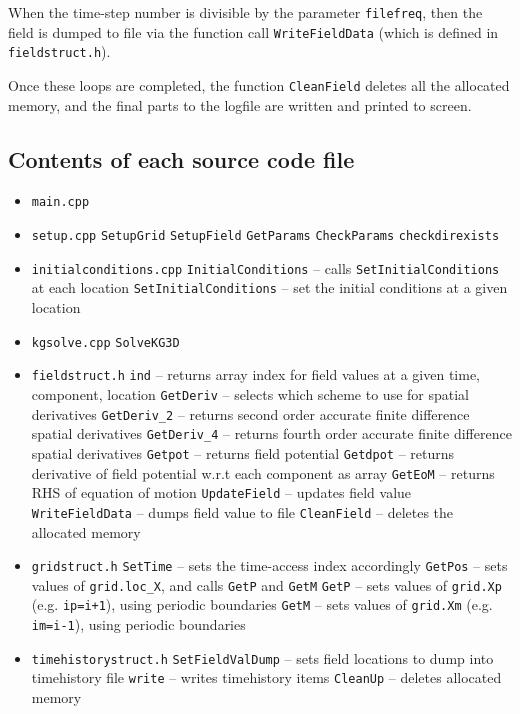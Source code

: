 \documentclass[amsmath,amssymb,12pt, eqsecnum]{revtex4}
\newcommand\codeRed[1]{\textcolor[rgb]{1,0,0}{{\tt #1}}}
\newcommand\codeBlue[1]{\textcolor[rgb]{0,0,1}{{\tt #1}}}
\begin{document}
When the time-step number is divisible by the parameter {\tt filefreq}, then the field is dumped to file via the function call \codeBlue{WriteFieldData} (which is defined in \codeRed{fieldstruct.h}).

Once these loops are completed, the function \codeBlue{CleanField} deletes all the allocated memory, and the final parts to the logfile are written and printed to screen.


\subsection{Contents of each source code file}
\begin{itemize}
\item \codeRed{main.cpp}
\item \codeRed{setup.cpp} 
\subitem \codeBlue{SetupGrid}
\subitem \codeBlue{SetupField}
\subitem \codeBlue{GetParams}
\subitem \codeBlue{CheckParams}
\subitem \codeBlue{checkdirexists}
\item \codeRed{initialconditions.cpp} 
\subitem \codeBlue{InitialConditions}  -- calls \codeBlue{SetInitialConditions} at each location
\subitem \codeBlue{SetInitialConditions} -- set the initial conditions at a given location
\item \codeRed{kgsolve.cpp} 
\subitem \codeBlue{SolveKG3D}
\item \codeRed{fieldstruct.h} 
\subitem \codeBlue{ind} -- returns array index for field values at a given time, component, location
\subitem \codeBlue{GetDeriv} -- selects which scheme to use for spatial derivatives
\subitem \codeBlue{GetDeriv\_2} -- returns second order accurate finite difference spatial derivatives
\subitem  \codeBlue{GetDeriv\_4} -- returns fourth order accurate finite difference spatial derivatives
\subitem \codeBlue{Getpot} -- returns field potential
\subitem \codeBlue{Getdpot} -- returns derivative of field potential w.r.t each component as array
\subitem \codeBlue{GetEoM} -- returns RHS of equation of motion
\subitem \codeBlue{UpdateField} -- updates field value
\subitem\codeBlue{WriteFieldData} -- dumps field value to file
\subitem \codeBlue{CleanField} -- deletes the allocated memory
\item \codeRed{gridstruct.h}
\subitem \codeBlue{SetTime} -- sets the time-access index accordingly
\subitem \codeBlue{GetPos} -- sets values of {\tt grid.loc\_X}, and calls \codeBlue{GetP} and  \codeBlue{GetM}
\subitem \codeBlue{GetP} -- sets values of {\tt grid.Xp} (e.g. {\tt ip=i+1}), using periodic boundaries 
\subitem \codeBlue{GetM} -- sets values of {\tt grid.Xm} (e.g. {\tt im=i-1}), using periodic boundaries 
\item \codeRed{timehistorystruct.h}
\subitem \codeBlue{SetFieldValDump} -- sets field locations to dump into timehistory file
\subitem \codeBlue{write} -- writes timehistory items
\subitem \codeBlue{CleanUp} -- deletes allocated memory
\end{itemize}



\end{document}
